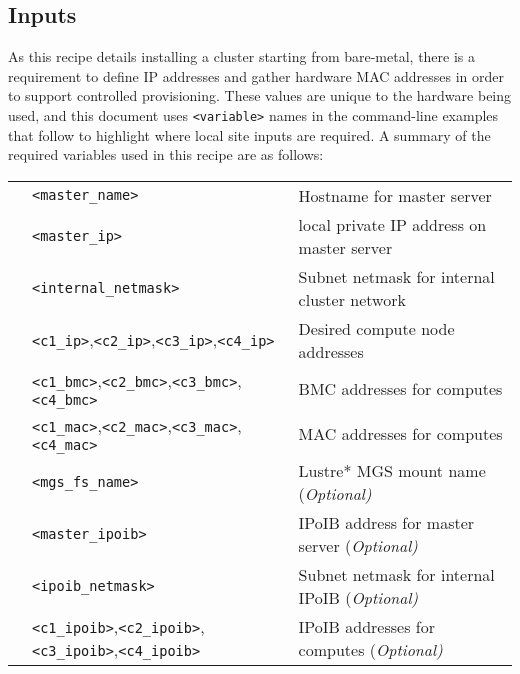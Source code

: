 \subsection{Inputs}
As this recipe details installing a cluster
starting from bare-metal, there is a requirement to define IP addresses and gather
hardware MAC addresses in order to support controlled provisioning. These values
are unique to the hardware being used, and this document uses \texttt{<variable>}
names in the command-line examples that follow to highlight where local site
inputs are required. A summary of the required variables used in this recipe
are as follows: \\

\vspace*{0.2cm}
\begin{tabular}{@{}>{\textbullet}cll@{}}
& \texttt{<master\_name>}  & Hostname for master server \\
& \texttt{<master\_ip>} & local private IP address on master server \\
& \texttt{<internal\_netmask>} & Subnet netmask for internal cluster network \\
& \texttt{<c1\_ip>},\texttt{<c2\_ip>},\texttt{<c3\_ip>},\texttt{<c4\_ip>}
& Desired compute node addresses \\
& \texttt{<c1\_bmc>},\texttt{<c2\_bmc>},\texttt{<c3\_bmc>},\texttt{<c4\_bmc>}
& BMC addresses for computes \\
& \texttt{<c1\_mac>},\texttt{<c2\_mac>},\texttt{<c3\_mac>},\texttt{<c4\_mac>}
& MAC addresses for computes \\
& \texttt{<mgs\_fs\_name>} & Lustre* MGS mount name (\em Optional)\\
& \texttt{<master\_ipoib>} & IPoIB address for master server (\em Optional) \\
& \texttt{<ipoib\_netmask>} & Subnet netmask for internal IPoIB (\em Optional) \\
& \texttt{<c1\_ipoib>},\texttt{<c2\_ipoib>},\texttt{<c3\_ipoib>},\texttt{<c4\_ipoib>}
& IPoIB addresses for computes (\em Optional)\\

\end{tabular}
